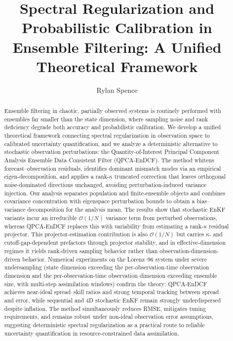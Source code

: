 \documentclass[11pt,a4paper]{article}
\title{Spectral Regularization and Probabilistic Calibration in Ensemble Filtering: A Unified Theoretical Framework}
\author{Rylan Spence}
\begin{document}
\maketitle

\begin{abstract}
Ensemble filtering in chaotic, partially observed systems is routinely performed with ensembles far smaller than the state dimension, where sampling noise and rank deficiency degrade both accuracy and probabilistic calibration. We develop a unified theoretical framework connecting spectral regularization in observation space to calibrated uncertainty quantification, and we analyze a deterministic alternative to stochastic observation perturbations: the Quantity-of-Interest Principal Component Analysis Ensemble Data Consistent Filter (QPCA-EnDCF). The method whitens forecast--observation residuals, identifies dominant mismatch modes via an empirical eigen-decomposition, and applies a rank-$\kappa$ truncated correction that leaves orthogonal noise-dominated directions unchanged, avoiding perturbation-induced variance injection. Our analysis separates population and finite-ensemble objects and combines covariance concentration with eigenspace perturbation bounds to obtain a bias--variance decomposition for the analysis mean.
The results show that stochastic EnKF variants incur an irreducible $\mathcal{O}(1/N)$ variance term from perturbed observations, whereas QPCA-EnDCF replaces this with variability from estimating a rank-$\kappa$ residual projector. This projector-estimation contribution is also $\mathcal{O}(1/N)$ but carries $\kappa$- and cutoff-gap-dependent prefactors through projector stability, and in effective-dimension regimes it yields rank-driven sampling behavior rather than observation-dimension-driven behavior. Numerical experiments on the Lorenz--96 system under severe undersampling (state dimension exceeding the per-observation-time observation dimension and the per-observation-time observation dimension exceeding ensemble size, with multi-step assimilation windows) confirm the theory: QPCA-EnDCF achieves near-ideal spread--skill ratios and strong temporal tracking between spread and error, while sequential and 4D stochastic EnKF remain strongly underdispersed despite inflation. The method simultaneously reduces RMSE, mitigates tuning requirements, and remains robust under non-ideal observation error assumptions, suggesting deterministic spectral regularization as a practical route to reliable uncertainty quantification in resource-constrained data assimilation.
\end{abstract}
\end{document}
